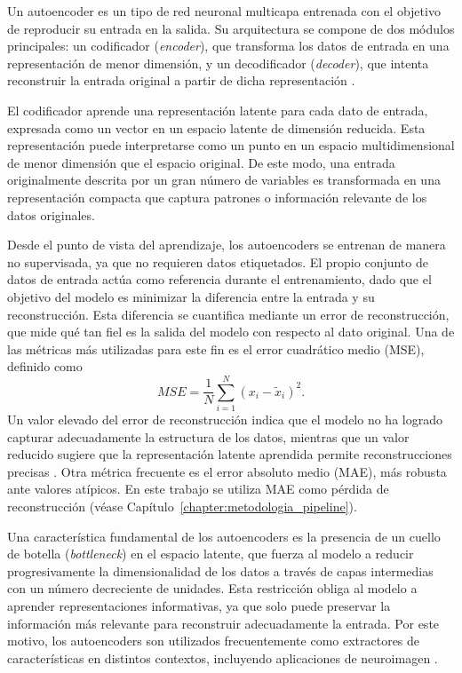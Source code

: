 Un autoencoder es un tipo de red neuronal multicapa entrenada con el objetivo de reproducir su entrada en la salida. Su arquitectura se compone de dos módulos principales: un codificador (\textit{encoder}), que transforma los datos de entrada en una representación de menor dimensión, y un decodificador (\textit{decoder}), que intenta reconstruir la entrada original a partir de dicha representación \cite{vieira2017using,michelucci2022introduction}.

El codificador aprende una representación latente para cada dato de entrada, expresada como un vector en un espacio latente de dimensión reducida. Esta representación puede interpretarse como un punto en un espacio multidimensional de menor dimensión que el espacio original. De este modo, una entrada originalmente descrita por un gran número de variables es transformada en una representación compacta que captura patrones o información relevante de los datos originales.

Desde el punto de vista del aprendizaje, los autoencoders se entrenan de manera no supervisada, ya que no requieren datos etiquetados. El propio conjunto de datos de entrada actúa como referencia durante el entrenamiento, dado que el objetivo del modelo es minimizar la diferencia entre la entrada y su reconstrucción. Esta diferencia se cuantifica mediante un error de reconstrucción, que mide qué tan fiel es la salida del modelo con respecto al dato original. Una de las métricas más utilizadas para este fin es el error cuadrático medio (MSE), definido como
\[
MSE = \frac{1}{N} \sum_{i=1}^{N} (x_i - \tilde{x}_i)^2.
\]
Un valor elevado del error de reconstrucción indica que el modelo no ha logrado capturar adecuadamente la estructura de los datos, mientras que un valor reducido sugiere que la representación latente aprendida permite reconstrucciones precisas \cite{michelucci2022introduction}. Otra métrica frecuente es el error absoluto medio (MAE), más robusta ante valores atípicos. En este trabajo se utiliza MAE como pérdida de reconstrucción (véase Capítulo~\ref{chapter:metodologia_pipeline}).

Una característica fundamental de los autoencoders es la presencia de un cuello de botella (\textit{bottleneck}) en el espacio latente, que fuerza al modelo a reducir progresivamente la dimensionalidad de los datos a través de capas intermedias con un número decreciente de unidades. Esta restricción obliga al modelo a aprender representaciones informativas, ya que solo puede preservar la información más relevante para reconstruir adecuadamente la entrada. Por este motivo, los autoencoders son utilizados frecuentemente como extractores de características en distintos contextos, incluyendo aplicaciones de neuroimagen \cite{vieira2017using}.

